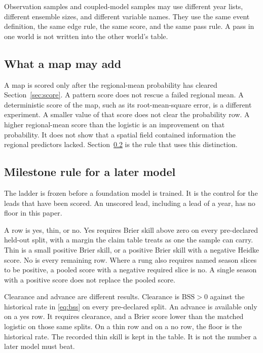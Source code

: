 \documentclass{ametsocV6.2}
\begin{document}
Observation samples and coupled-model samples may use different year lists, different ensemble sizes, and different variable names.
They use the same event definition, the same edge rule, the same score, and the same pass rule.
A pass in one world is not written into the other world's table.

\subsection{What a map may add}
\label{sec:map}

A map is scored only after the regional-mean probability has cleared Section~\ref{sec:score}.
A pattern score does not rescue a failed regional mean.
A deterministic score of the map, such as its root-mean-square error, is a different experiment.
A smaller value of that score does not clear the probability row.
A higher regional-mean score than the logistic is an improvement on that probability.
It does not show that a spatial field contained information the regional predictors lacked.
Section~\ref{sec:milestone} is the rule that uses this distinction.

\subsection{Milestone rule for a later model}
\label{sec:milestone}

The ladder is frozen before a foundation model is trained.
It is the control for the leads that have been scored.
An unscored lead, including a lead of a year, has no floor in this paper.

A row is yes, thin, or no.
Yes requires Brier skill above zero on every pre-declared held-out split, with a margin the claim table treats as one the sample can carry.
Thin is a small positive Brier skill, or a positive Brier skill with a negative Heidke score.
No is every remaining row.
Where a rung also requires named season slices to be positive, a pooled score with a negative required slice is no.
A single season with a positive score does not replace the pooled score.

Clearance and advance are different results.
Clearance is $\mathrm{BSS}>0$ against the historical rate in \eqref{eq:bss} on every pre-declared split.
An advance is available only on a yes row.
It requires clearance, and a Brier score lower than the matched logistic on those same splits.
On a thin row and on a no row, the floor is the historical rate.
The recorded thin skill is kept in the table.
It is not the number a later model must beat.
\end{document}
